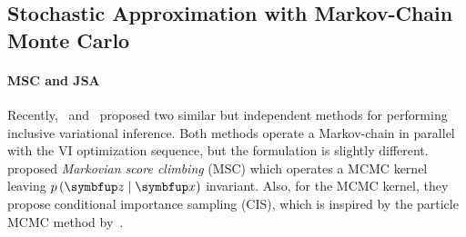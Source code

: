 %
%
\subsection{Stochastic Approximation with Markov-Chain Monte Carlo}\label{section:msc}
%
\paragraph{MSC and JSA}
Recently,~\citeauthor{NEURIPS2020_b2070693} and~\citeauthor{pmlr-v124-ou20a} proposed two similar but independent methods for performing inclusive variational inference.
Both methods operate a Markov-chain in parallel with the VI optimization sequence, but the formulation is slightly different.
\citeauthor{NEURIPS2020_b2070693} proposed \textit{Markovian score climbing} (MSC) which operates a MCMC kernel leaving \(p\left(\vz \mid \vx \right)\) invariant.
Also, for the MCMC kernel, they propose conditional importance sampling (CIS), which is inspired by the particle MCMC method by~\cite{andrieu_particle_2010}.

